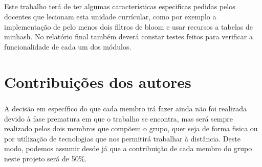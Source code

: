 \documentclass{report}
\begin{document}
\paragraph{}
Este trabalho terá de ter algumas características especificas pedidas pelos docentes que lecionam esta unidade currícular, como por exemplo a implementação de pelo menos dois filtros de bloom e usar recursos a tabelas de minhash. No relatório final também deverá constar testes feitos para verificar a funcionalidade de cada um dos módulos.

\chapter{Contribuições dos autores}
\label{chap.Contribuições dos autores}
\paragraph{}
A decisão em específico do que cada membro irá fazer ainda não foi realizada devido à fase prematura em que o trabalho se encontra, mas será sempre realizado pelos dois membros que compõem o grupo, quer seja de forma fisica ou por utilização de tecnologias que nos permitirá trabalhar à distância. Deste modo, podemos assumir desde já que a contribuição de cada membro do grupo neste projeto será de 50\%.




\printbibliography
\end{document}
